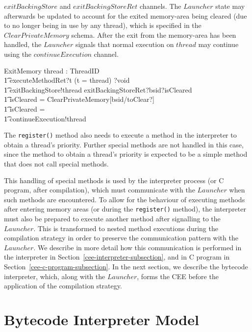 $exitBackingStore$ and $exitBackingStoreRet$ channels.
The $Launcher$ state may afterwards be updated to account for the
exited memory-area being cleared (due to no longer being in use by any
thread), which is specified in the $ClearPrivateMemory$ schema.
After the exit from the memory-area has been handled, the $Launcher$
signals that normal execution on $thread$ may continue using the
$continueExecution$ channel.
\begin{circusaction}
  ExitMemory \circdef \circval thread : ThreadID \circspot \\
  \t1 executeMethodRet?t \prefixcolon (t = thread) ?void \\
  \t1 {} \then exitBackingStore!thread \then exitBackingStoreRet?bsid?isCleared \then {} \\
  \t1 \circif isCleared = \true \circthen \lschexpract ClearPrivateMemory[bsid/toClear?] \rschexpract \\
  \t1 {} \circelse isCleared = \false \circthen \Skip \\
  \t1 \circfi \circseq continueExecution!thread \then \Skip
\end{circusaction}

The \texttt{register()} method also needs to execute a method in the
interpreter to obtain a thread's priority.
Further special methods are not handled in this case, since the method
to obtain a thread's priority is expected to be a simple method that
does not call special methods.

This handling of special methods is used by the interpreter process
(or C program, after compilation), which must communicate with the
$Launcher$ when such methods are encountered.
To allow for the behaviour of executing methods after entering memory
areas (or during the \texttt{register()} method), the interpreter must
also be prepared to execute another method after signalling to the
$Launcher$.
This is transformed to nested method executions during the compilation
strategy in order to preserve the communication pattern with the
$Launcher$.
We describe in more detail how this communication is performed in the
interpreter in Section~\ref{cee-interpreter-subsection}, and in C
program in Section~\ref{cee-c-program-subsection}.
In the next section, we describe the bytecode interpreter, which,
along with the $Launcher$, forms the CEE before the application of the
compilation strategy.

% 

\section{Bytecode Interpreter Model}
\label{cee-interpreter-section}

